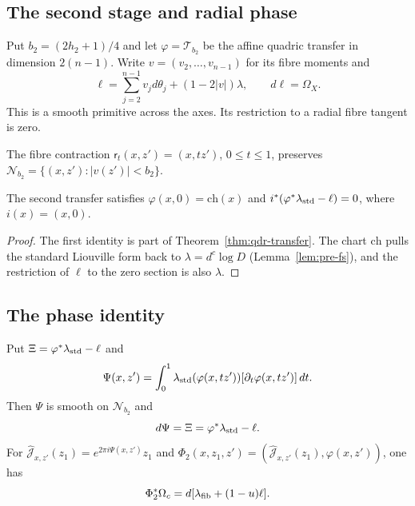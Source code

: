 \subsection{The second stage and radial phase}\label{sec:two-second}

Put $b_2=(2h_2+1)/4$ and let $\varphi=\mathcal T_{b_2}$ be the affine quadric transfer in dimension $2(n-1)$.
Write $v=(v_2,\dots,v_{n-1})$ for its fibre moments and
\[
 \ell=\sum_{j=2}^{n-1}v_jd\theta_j+(1-2|v|)\lambda,\qquad d\ell=\Omega_X.
\]
This is a smooth primitive across the axes. Its restriction to a radial fibre tangent is zero.

The fibre contraction $\mathsf r_t(x,z')=(x,tz')$, $0\le t\le1$, preserves $\mathcal N_{b_2}=\{(x,z'):|v(z')|<b_2\}$.

\begin{lemma}\label{lem:two-zero-fixed}
The second transfer satisfies $\varphi(x,0)=\mathrm{ch}(x)$ and
$i^*(\varphi^*\lambda_{\rm std}-\ell)=0$, where $i(x)=(x,0)$.
\end{lemma}

\begin{proof}
The first identity is part of Theorem~\ref{thm:qdr-transfer}. The chart $\mathrm{ch}$ pulls the standard Liouville form back
to $\lambda=d^c\log D$ (Lemma~\ref{lem:pre-fs}), and the restriction of $\ell$ to the zero section is also $\lambda$.
\end{proof}

\subsection{The phase identity}\label{sec:two-identification}

\begin{lemma}\label{lem:two-identification}
Put $\Xi=\varphi^*\lambda_{\rm std}-\ell$ and
\[
 \Psi(x,z')=\int_0^1\lambda_{\rm std}(\varphi(x,tz'))[\partial_t\varphi(x,tz')]\,dt.
\]
Then $\Psi$ is smooth on $\mathcal N_{b_2}$ and
\begin{equation}\label{eq:two-homotopy}
 d\Psi=\Xi=\varphi^*\lambda_{\rm std}-\ell.
\end{equation}
For $\hat{\mathcal J}_{x,z'}(z_1)=e^{2\pi i\Psi(x,z')}z_1$ and
$\Phi_2(x,z_1,z')=(\hat{\mathcal J}_{x,z'}(z_1),\varphi(x,z'))$, one has
\begin{equation}\label{eq:two-Phi2}
 \Phi_2^*\Omega_c=d[\lambda_{\rm fib}+(1-u)\ell].
\end{equation}
\end{lemma}

